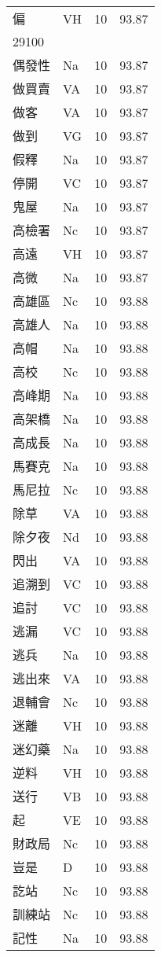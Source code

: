 \documentclass[twocolumn]{book}
\begin{document}
\begin{supertabular}{llrr}
偏 & VH & 10 &  93.87\\
29100\\
偶發性 & Na & 10 &  93.87\\
做買賣 & VA & 10 &  93.87\\
做客 & VA & 10 &  93.87\\
做到 & VG & 10 &  93.87\\
假釋 & Na & 10 &  93.87\\
停開 & VC & 10 &  93.87\\
鬼屋 & Na & 10 &  93.87\\
高檢署 & Nc & 10 &  93.87\\
高遠 & VH & 10 &  93.87\\
高微 & Na & 10 &  93.87\\
高雄區 & Nc & 10 &  93.88\\
高雄人 & Na & 10 &  93.88\\
高帽 & Na & 10 &  93.88\\
高校 & Nc & 10 &  93.88\\
高峰期 & Na & 10 &  93.88\\
高架橋 & Na & 10 &  93.88\\
高成長 & Na & 10 &  93.88\\
馬賽克 & Na & 10 &  93.88\\
馬尼拉 & Nc & 10 &  93.88\\
除草 & VA & 10 &  93.88\\
除夕夜 & Nd & 10 &  93.88\\
閃出 & VA & 10 &  93.88\\
追溯到 & VC & 10 &  93.88\\
追討 & VC & 10 &  93.88\\
逃漏 & VC & 10 &  93.88\\
逃兵 & Na & 10 &  93.88\\
逃出來 & VA & 10 &  93.88\\
退輔會 & Nc & 10 &  93.88\\
迷離 & VH & 10 &  93.88\\
迷幻藥 & Na & 10 &  93.88\\
逆料 & VH & 10 &  93.88\\
送行 & VB & 10 &  93.88\\
起 & VE & 10 &  93.88\\
財政局 & Nc & 10 &  93.88\\
豈是 & D & 10 &  93.88\\
訖站 & Nc & 10 &  93.88\\
訓練站 & Nc & 10 &  93.88\\
記性 & Na & 10 &  93.88\\

\end{supertabular}
\end{document}
